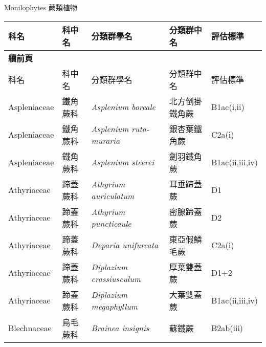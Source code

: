 \noindent\normalfont\selectfont Monilophytes 蕨類植物
\footnotesize\selectfont
        {\def\arraystretch{1.5}\tabcolsep=2pt
        \begin{longtable}{p{2.5cm}p{2.5cm}p{4.5cm}p{2.5cm}p{3cm}}
        \toprule
          科名 & 科中名 & 分類群學名 & 分類群中名 & 評估標準 \\
        \midrule 
        \endfirsthead

        {{\bfseries 續前頁 }} \\
        科名 & 科中名 & 分類群學名 & 分類群中名 & 評估標準 \\
        \midrule
        \endhead
                Aspleniaceae & 鐵角蕨科 & \textit{Asplenium boreale}  & 北方倒掛鐵角蕨 & B1ac(i,ii) \index{Asplenium@\textit{Asplenium}!boreale@\textit{boreale}}  \index{北方倒掛鐵角蕨} \\
    Aspleniaceae & 鐵角蕨科 & \textit{Asplenium ruta-muraria}  & 銀杏葉鐵角蕨 & C2a(i) \index{Asplenium@\textit{Asplenium}!ruta-muraria@\textit{ruta-muraria}}  \index{銀杏葉鐵角蕨} \\
    Aspleniaceae & 鐵角蕨科 & \textit{Asplenium steerei}  & 劍羽鐵角蕨 & B1ac(ii,iii,iv) \index{Asplenium@\textit{Asplenium}!steerei@\textit{steerei}}  \index{劍羽鐵角蕨} \\
    Athyriaceae & 蹄蓋蕨科 & \textit{Athyrium auriculatum}  & 耳垂蹄蓋蕨 & D1 \index{Athyrium@\textit{Athyrium}!auriculatum@\textit{auriculatum}}  \index{耳垂蹄蓋蕨} \\
    Athyriaceae & 蹄蓋蕨科 & \textit{Athyrium puncticaule}  & 密腺蹄蓋蕨 & D2 \index{Athyrium@\textit{Athyrium}!puncticaule@\textit{puncticaule}}  \index{密腺蹄蓋蕨} \\
    Athyriaceae & 蹄蓋蕨科 & \textit{Deparia unifurcata}  & 東亞假鱗毛蕨 & C2a(i) \index{Deparia@\textit{Deparia}!unifurcata@\textit{unifurcata}}  \index{東亞假鱗毛蕨} \\
    Athyriaceae & 蹄蓋蕨科 & \textit{Diplazium crassiusculum}  & 厚葉雙蓋蕨 & D1+2 \index{Diplazium@\textit{Diplazium}!crassiusculum@\textit{crassiusculum}}  \index{厚葉雙蓋蕨} \\
    Athyriaceae & 蹄蓋蕨科 & \textit{Diplazium megaphyllum}  & 大葉雙蓋蕨 & B1ac(ii,iii,iv) \index{Diplazium@\textit{Diplazium}!megaphyllum@\textit{megaphyllum}}  \index{大葉雙蓋蕨} \\
    Blechnaceae & 烏毛蕨科 & \textit{Brainea insignis}  & 蘇鐵蕨 & B2ab(iii) \index{Brainea@\textit{Brainea}!insignis@\textit{insignis}}  \index{蘇鐵蕨} \\

\end{longtable}}
